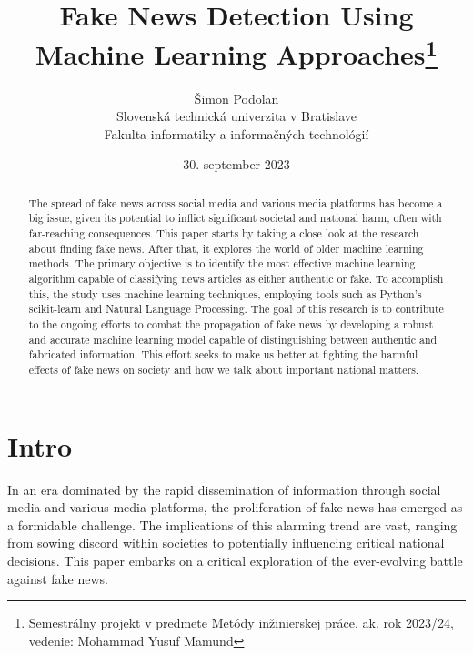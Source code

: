 \documentclass[10pt,twoside,slovak,a4paper]{article}
\title{Fake News Detection Using Machine Learning Approaches\thanks{Semestrálny projekt v predmete Metódy inžinierskej práce, ak. rok 2023/24, vedenie: Mohammad Yusuf Mamund}} %
\author{Šimon Podolan\\[2pt]
	{\small Slovenská technická univerzita v Bratislave}\\
	{\small Fakulta informatiky a informačných technológií}\\
	{\small \text{xpodolan@stuba.sk}}}
\date{\small 30. september 2023} %
\begin{document}
    \maketitle
    
\begin{abstract}
The spread of fake news across social media and various media platforms has become a big issue, given its potential to inflict significant societal and national harm, often with far-reaching consequences. This paper starts by taking a close look at the research about finding fake news. After that, it explores the world of older machine learning methods.
The primary objective is to identify the most effective machine learning algorithm capable of classifying news articles as either authentic or fake. To accomplish this, the study uses machine learning techniques, employing tools such as Python's scikit-learn and Natural Language Processing. The goal of this research is to contribute to the ongoing efforts to combat the propagation of fake news by developing a robust and accurate machine learning model capable of distinguishing between authentic and fabricated information. This effort seeks to make us better at fighting the harmful effects of fake news on society and how we talk about important national matters.
\end{abstract}



\section{Intro}

In an era dominated by the rapid dissemination of information through social media and various media platforms, the proliferation of fake news has emerged as a formidable challenge. The implications of this alarming trend are vast, ranging from sowing discord within societies to potentially influencing critical national decisions. This paper embarks on a critical exploration of the ever-evolving battle against fake news.
\end{document}
